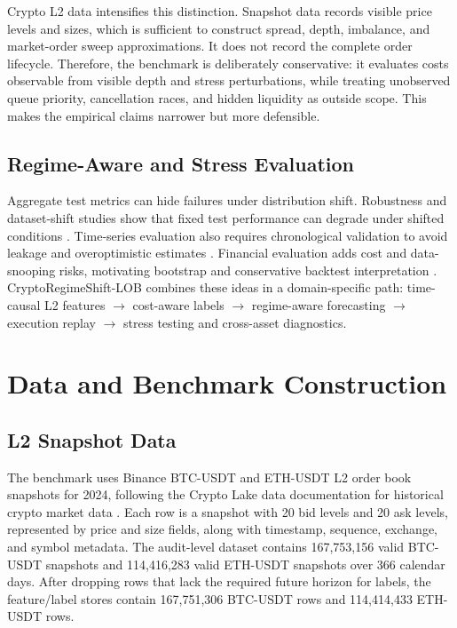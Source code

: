 \documentclass[conference]{IEEEtran}
\begin{document}
Crypto L2 data intensifies this distinction. Snapshot data records visible price levels and sizes, which is sufficient to construct spread, depth, imbalance, and market-order sweep approximations. It does not record the complete order lifecycle. Therefore, the benchmark is deliberately conservative: it evaluates costs observable from visible depth and stress perturbations, while treating unobserved queue priority, cancellation races, and hidden liquidity as outside scope. This makes the empirical claims narrower but more defensible.

\subsection{Regime-Aware and Stress Evaluation}
Aggregate test metrics can hide failures under distribution shift. Robustness and dataset-shift studies show that fixed test performance can degrade under shifted conditions \cite{quinonero2009datasetshift,ovadia2019uncertainty,koh2021wilds}. Time-series evaluation also requires chronological validation to avoid leakage and overoptimistic estimates \cite{bergmeir2018timeseriescv,cerqueira2020timeserieseval}. Financial evaluation adds cost and data-snooping risks, motivating bootstrap and conservative backtest interpretation \cite{efron1979bootstrap,politis1994stationarybootstrap,white2000realitycheck,bailey2016backtestoverfitting,lopezdeprado2018afml}. CryptoRegimeShift-LOB combines these ideas in a domain-specific path: time-causal L2 features $\rightarrow$ cost-aware labels $\rightarrow$ regime-aware forecasting $\rightarrow$ execution replay $\rightarrow$ stress testing and cross-asset diagnostics.

\section{Data and Benchmark Construction}
\subsection{L2 Snapshot Data}
The benchmark uses Binance BTC-USDT and ETH-USDT L2 order book snapshots for 2024, following the Crypto Lake data documentation for historical crypto market data \cite{cryptolake_data}. Each row is a snapshot with 20 bid levels and 20 ask levels, represented by price and size fields, along with timestamp, sequence, exchange, and symbol metadata. The audit-level dataset contains 167,753,156 valid BTC-USDT snapshots and 114,416,283 valid ETH-USDT snapshots over 366 calendar days. After dropping rows that lack the required future horizon for labels, the feature/label stores contain 167,751,306 BTC-USDT rows and 114,414,433 ETH-USDT rows.
\end{document}
